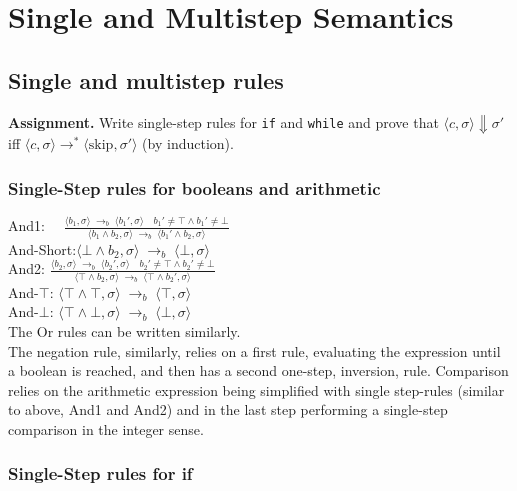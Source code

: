 \section{Single and Multistep Semantics}
\subsection{Single and multistep rules}

\textbf{Assignment.}
Write single-step rules for \texttt{if} and \texttt{while} and prove that
$\langle c,\sigma\rangle\Downarrow\sigma'$
iff
$\langle c,\sigma\rangle\rightarrow^{*}\langle \text{skip},\sigma'\rangle$
(by induction).


\subsubsection{Single-Step rules for booleans and arithmetic}
And1: $ \quad
\frac{
  \langle b_1, \sigma\rangle \;\to_b\; \langle b_1', \sigma\rangle \quad b_1' \not = \top \land b_1' \not = \bot
}{
  \langle b_1 \land b_2, \sigma\rangle \;\to_b\; \langle b_1' \land b_2, \sigma\rangle
}
$\\
And-Short:$
\langle \bot \land b_2, \sigma\rangle
  \;\to_b\;
\langle \bot, \sigma\rangle$ \\
And2: $\frac{
  \langle b_2, \sigma\rangle \;\to_b\; \langle b_2', \sigma\rangle \quad b_2' \not = \top \land b_2' \not = \bot
}{
  \langle \top \land b_2, \sigma\rangle \;\to_b\; \langle \top \land b_2', \sigma\rangle
}$\\
And-$\top$:
$\langle \top \land \top, \sigma\rangle
\;\to_b\;
\langle \top, \sigma\rangle$\\
And-$\bot$:
$\langle \top \land \bot, \sigma\rangle
\;\to_b\;
\langle \bot, \sigma\rangle$\\
The Or rules can be written similarly. \\
The negation rule, similarly, relies on a first rule, evaluating the expression until a boolean is reached, and then has a second one-step, inversion, rule.
Comparison relies on the arithmetic expression being simplified with single step-rules (similar to above, And1 and And2) and in the last step performing a single-step comparison in the integer sense.



\subsubsection{Single-Step rules for if}

